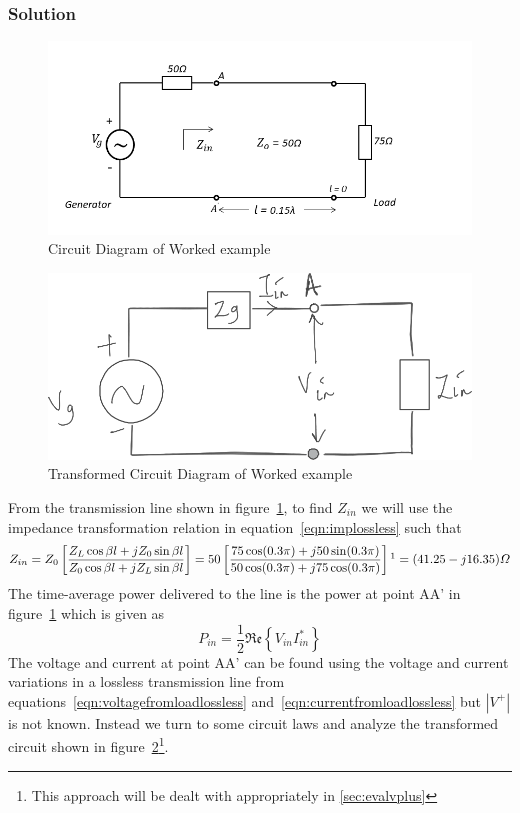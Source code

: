 \begin{exmp}
\subsubsection*{Solution}
\begin{figure}[h]
\centering
\includegraphics[width=1\linewidth]{./graphics/power_problem}
\caption{Circuit Diagram of Worked example}
\label{fig:powerproblem}
\end{figure}
\begin{figure}[h]
\centering
\includegraphics[width=.7\linewidth]{./graphics/power_problem2_temp}
\caption{Transformed Circuit Diagram of Worked example}
\label{fig:powerproblem2}
\end{figure}

From the transmission line shown in figure~\ref{fig:powerproblem}, to find $Z_{in}$ we will use the impedance transformation relation in equation~\eqref{eqn:implossless} such that
\begin{dmath*}
Z_{in} = Z_0\left[\frac{Z_L\cos\beta l + jZ_0\sin\beta l}{Z_0\cos\beta l + jZ_L\sin\beta l} \right]
= 50\left[\frac{75\cos(0.3\pi) + j50\sin(0.3\pi)}{50\cos(0.3\pi) + j75\cos(0.3\pi)} \right]\footnotemark
= (41.25 - j16.35)\varOmega
\end{dmath*}
The time-average power delivered to the line is the power at point AA' in figure~\ref{fig:powerproblem} which is given as
\begin{dmath*}
P_{in} = \frac{1}{2}\mathfrak{Re}\left\lbrace V_{in}I_{in}^*\right\rbrace
\end{dmath*}
The voltage and current at point AA' can be found using the voltage and current variations in a lossless transmission line from equations~\eqref{eqn:voltagefromloadlossless} and~\eqref{eqn:currentfromloadlossless} but $|V^+|$ is not known. Instead we turn to some circuit laws and analyze the transformed circuit shown in figure~\ref{fig:powerproblem2}\footnote{This approach will be dealt with appropriately in \autoref{sec:evalvplus}}.


\end{exmp}
